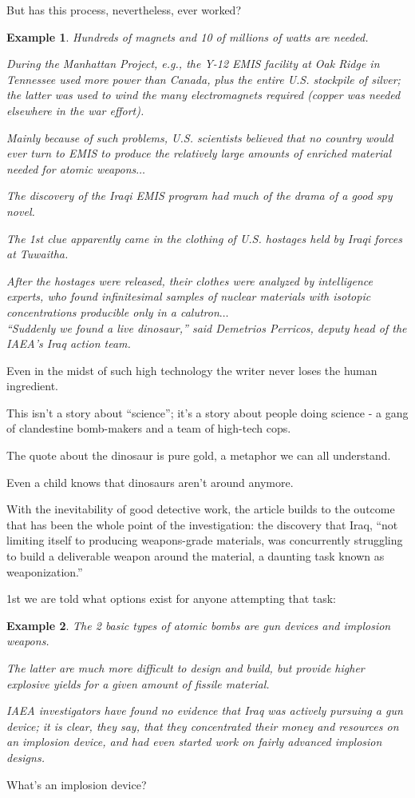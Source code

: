 \documentclass{book}
\numberwithin{equation}{section}
\newtheorem{example}{Example}[chapter]
\begin{document}
But has this process, nevertheless, ever worked?
\begin{example}
    Hundreds of magnets and 10 of millions of watts are needed.
    
    During the Manhattan Project, e.g., the Y-12 EMIS facility at Oak Ridge in Tennessee used more power than Canada, plus the entire U.S. stockpile of silver; the latter was used to wind the many electromagnets required (copper was needed elsewhere in the war effort).
    
    Mainly because of such problems, U.S. scientists believed that no country would ever turn to EMIS to produce the relatively large amounts of enriched material needed for atomic weapons$\ldots$
    
    The discovery of the Iraqi EMIS program had much of the drama of a good spy novel.
    
    The 1st clue apparently came in the clothing of U.S. hostages held by Iraqi forces at Tuwaitha.
    
    After the hostages were released, their clothes were analyzed by intelligence experts, who found infinitesimal samples of nuclear materials with isotopic concentrations producible only in a calutron$\ldots$
    \\
    
    ``Suddenly we found a live dinosaur,'' said Demetrios Perricos, deputy head of the IAEA's Iraq action team.
\end{example}
Even in the midst of such high technology the writer never loses the human ingredient.

This isn't a story about ``science''; it's a story about people doing science - a gang of clandestine bomb-makers and a team of high-tech cops.

The quote about the dinosaur is pure gold, a metaphor we can all understand.

Even a child knows that dinosaurs aren't around anymore.

%
With the inevitability of good detective work, the article builds to the outcome that has been the whole point of the investigation: the discovery that Iraq, ``not limiting itself to producing weapons-grade materials, was concurrently struggling to build a deliverable weapon around the material, a daunting task known as weaponization.''

1st we are told what options exist for anyone attempting that task:
\begin{example}
    The 2 basic types of atomic bombs are gun devices and implosion weapons.
    
    The latter are much more difficult to design and build, but provide higher explosive yields for a given amount of fissile material.
    
    IAEA investigators have found no evidence that Iraq was actively pursuing a gun device; it is clear, they say, that they concentrated their money and resources on an implosion device, and had even started work on fairly advanced implosion designs.
\end{example}
What's an implosion device?
\end{document}
